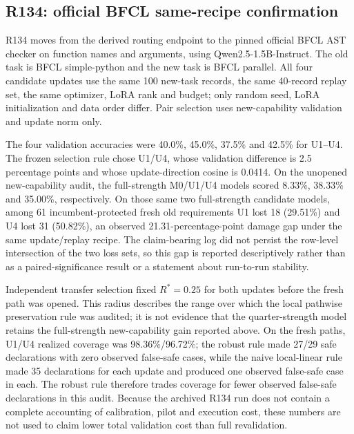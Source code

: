 \documentclass[11pt,letterpaper]{article}
\theoremstyle{plain}
\newcommand{\1}{\mathbf 1}
\begin{document}
\subsection{R134: official BFCL same-recipe confirmation}
R134 moves from the derived routing endpoint to the pinned official BFCL AST checker on function names and arguments, using Qwen2.5-1.5B-Instruct. The old task is BFCL simple-python and the new task is BFCL parallel. All four candidate updates use the same 100 new-task records, the same 40-record replay set, the same optimizer, LoRA rank and budget; only random seed, LoRA initialization and data order differ. Pair selection uses new-capability validation and update norm only.

The four validation accuracies were 40.0\%, 45.0\%, 37.5\% and 42.5\% for U1--U4. The frozen selection rule chose U1/U4, whose validation difference is 2.5 percentage points and whose update-direction cosine is 0.0414. On the unopened new-capability audit, the full-strength M0/U1/U4 models scored 8.33\%, 38.33\% and 35.00\%, respectively. On those same two full-strength candidate models, among 61 incumbent-protected fresh old requirements U1 lost 18 (29.51\%) and U4 lost 31 (50.82\%), an observed 21.31-percentage-point damage gap under the same update/replay recipe. The claim-bearing log did not persist the row-level intersection of the two loss sets, so this gap is reported descriptively rather than as a paired-significance result or a statement about run-to-run stability.

Independent transfer selection fixed $R^*=0.25$ for both updates before the fresh path was opened. This radius describes the range over which the local pathwise preservation rule was audited; it is not evidence that the quarter-strength model retains the full-strength new-capability gain reported above. On the fresh paths, U1/U4 realized coverage was 98.36\%/96.72\%; the robust rule made 27/29 safe declarations with zero observed false-safe cases, while the naive local-linear rule made 35 declarations for each update and produced one observed false-safe case in each. The robust rule therefore trades coverage for fewer observed false-safe declarations in this audit. Because the archived R134 run does not contain a complete accounting of calibration, pilot and execution cost, these numbers are not used to claim lower total validation cost than full revalidation.
\end{document}
